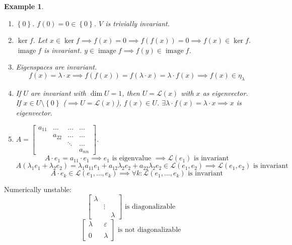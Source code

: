 \documentclass{article}
\newtheorem{example}{Example}  \numberwithin{example}{section}
\newcommand{\set}[1]{\left\{#1\right\}}
\DeclareMathOperator{\im}{image}
\begin{document}
\begin{example} %
  \begin{enumerate}
    \item $\set{0}$. $f(0) = 0 \in \set{0}$. $V$ is trivially invariant.
    \item $\ker{f}$. Let $x \in \ker{f} \implies f(x) = 0 \implies f(f(x)) = 0 \implies f(x) \in \ker{f}$. \\
      $\im{f}$ is invariant. $y \in \im{f} \implies f(y) \in \im{f}$.
    \item Eigenspaces are invariant.
      \[ f(x) = \lambda \cdot x \implies f(f(x)) = f(\lambda \cdot x) = \lambda \cdot f(x) \implies f(x) \in \eta_{\lambda} \]
    \item If $U$ are invariant with $\dim{U} = 1$, then $U = \mathcal L(x)$ with $x$ as eigenvector. \\
      If $x \in U \setminus \set{0}$ ($\implies U = \mathcal L(x)$), $f(x) \in U$. $\exists \lambda \cdot f(x) = \lambda \cdot x \implies x$ is eigenvector.
    \item $A = \begin{bmatrix} a_{11} & \dots & \dots & \dots \\ & a_{22} & \dots & \dots \\ & & \ddots & \dots \\ & & & a_{nn} \end{bmatrix}$.
      \[ A \cdot e_1 = a_{11} \cdot e_1 \implies e_1 \text{ is eigenvalue } \implies \mathcal L(e_1) \text{ is invariant} \]
      \[ A(\lambda_1 e_1 + \lambda_2 e_2) = \lambda_1 a_{11} e_1 + a_{12} \lambda_2 e_2 + a_{22} \lambda_2 e_2 \in \mathcal L(e_1, e_2) \implies \mathcal L(e_1, e_2) \text{ is invariant} \]
      \[ A \cdot e_k \in \mathcal L(e_1, \dots, e_k) \implies \forall k: \mathcal L(e_1, \dots, e_k) \text{ is invariant} \]
  \end{enumerate}
\end{example}

Numerically unstable:
\[
  \begin{bmatrix} \lambda & & \\ & \vdots & \\ & & \lambda \end{bmatrix}
  \text{ is diagonalizable}
\] \[
  \begin{bmatrix} \lambda & & \varepsilon \\ & & \\ 0 & & \lambda \end{bmatrix}
  \text{ is not diagonalizable}
\]
\end{document}
